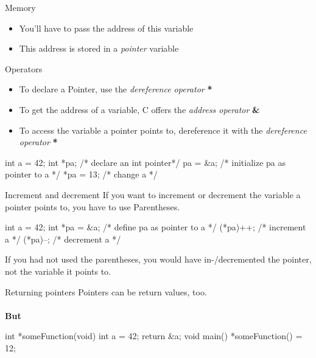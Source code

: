 \documentclass[10pt,graphics,aspectratio=169,table]{beamer}
\begin{document}
\begin{frame}{Memory}
    \begin{itemize}[<+->]
        \item You'll have to pass the address of this variable
        \item This address is stored in a \textit{pointer} variable
    \end{itemize}
\end{frame}


\begin{frame}[fragile]{Operators}
    \begin{itemize}
        \item To declare a Pointer, use the \textit{dereference operator} \textbf{*}
        \item To get the address of a variable, C offers the \textit{address operator} \textbf{\&}
        \item To access the variable a pointer points to, dereference it with the \textit{dereference operator} \textbf{*}
    \end{itemize}
    \begin{codeblock}[numbers=none]
int a = 42;
int *pa;    /* declare an int pointer*/
pa = &a;    /* initialize pa as pointer to a */
*pa = 13;    /* change a */
    \end{codeblock}
\end{frame}

\begin{frame}[fragile]{Increment and decrement}
    If you want to increment or decrement the variable a pointer points to, you have to use Parentheses.
    \begin{codeblock}[numbers=none]
int a = 42;
int *pa = &a;    /* define pa as pointer to a */
(*pa)++;        /* increment a */
(*pa)--;        /* decrement a */
\end{codeblock}

If you had not used the parentheses, you would have in-/decremented the pointer, not the variable it points to. 
\end{frame}

\begin{frame}[fragile]{Returning pointers}
Pointers can be return values, too.\\\ \\
\textbf{But} 
    \begin{codeblock}
int *someFunction(void) {    
    int a = 42;
    return &a;
}
void main(){
    *someFunction() = 12;
}
    \end{codeblock}
\end{frame}
\end{document}
